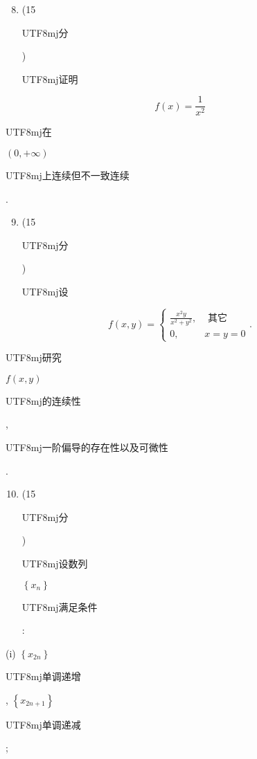 \documentclass[10pt]{article}
\begin{document}
\begin{enumerate}
  \setcounter{enumi}{7}
  \item (15 \begin{CJK}{UTF8}{mj}分\end{CJK}) \begin{CJK}{UTF8}{mj}证明\end{CJK}
\end{enumerate}
$$
f(x)=\frac{1}{x^{2}}
$$
\begin{CJK}{UTF8}{mj}在\end{CJK} $(0,+\infty)$ \begin{CJK}{UTF8}{mj}上连续但不一致连续\end{CJK}.

\begin{enumerate}
  \setcounter{enumi}{8}
  \item (15 \begin{CJK}{UTF8}{mj}分\end{CJK}) \begin{CJK}{UTF8}{mj}设\end{CJK}
\end{enumerate}
$$
f(x, y)=\left\{\begin{array}{ll}
\frac{x^{2} y}{x^{2}+y^{2}}, & \text { 其它 } \\
0, & x=y=0
\end{array} .\right.
$$
\begin{CJK}{UTF8}{mj}研究\end{CJK} $f(x, y)$ \begin{CJK}{UTF8}{mj}的连续性\end{CJK}, \begin{CJK}{UTF8}{mj}一阶偏导的存在性以及可微性\end{CJK}.

\begin{enumerate}
  \setcounter{enumi}{9}
  \item (15 \begin{CJK}{UTF8}{mj}分\end{CJK}) \begin{CJK}{UTF8}{mj}设数列\end{CJK} $\left\{x_{n}\right\}$ \begin{CJK}{UTF8}{mj}满足条件\end{CJK}:
\end{enumerate}
(i) $\left\{x_{2 n}\right\}$ \begin{CJK}{UTF8}{mj}单调递增\end{CJK}, $\left\{x_{2 n+1}\right\}$ \begin{CJK}{UTF8}{mj}单调递减\end{CJK};
\end{document}
